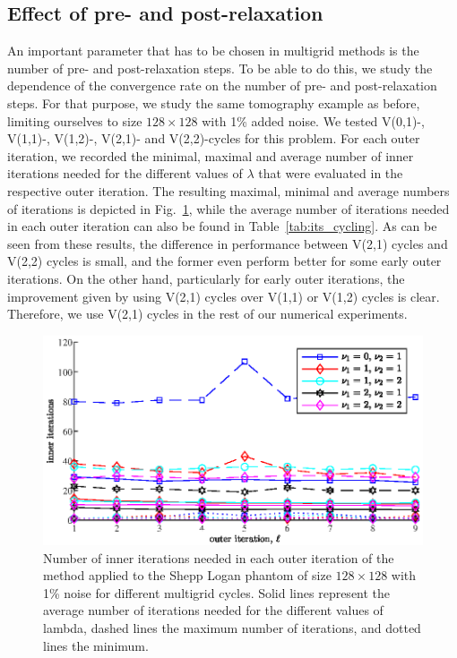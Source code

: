 \subsection{Effect of pre- and post-relaxation}
\label{ssec:relaxation_comparison}
An important parameter that has to be chosen in multigrid methods is the number of pre- and post-relaxation steps. To be able to do this, we study the dependence of the convergence rate on the number of pre- and post-relaxation steps. For that purpose, we study the same tomography example as before, limiting ourselves to size $128 \times 128$ with 1\% added noise. We tested V(0,1)-, V(1,1)-, V(1,2)-, V(2,1)- and V(2,2)-cycles for this problem. For each outer iteration, we recorded the minimal, maximal and average number of inner iterations needed for the different values of $\lambda$ that were evaluated in the respective outer iteration. The resulting maximal, minimal and average numbers of iterations is depicted in Fig.~\ref{fig:its_cycling}, while the average number of iterations needed in each outer iteration can also be found in Table~\ref{tab:its_cycling}. As can be seen from these results, the difference in performance between V(2,1) cycles and V(2,2) cycles is small, and the former even perform better for some early outer iterations.  On the other hand, particularly for early outer iterations, the improvement given by using V(2,1) cycles over V(1,1) or V(1,2) cycles is clear.   Therefore, we use V(2,1) cycles in the rest of our numerical experiments.
\begin{figure}[htbp]
\begin{center}
\includegraphics{figures/its_cycling}
\caption{Number of inner iterations needed in each outer iteration of the method applied to the Shepp Logan phantom of size $128 \times 128$ with 1\% noise for different multigrid cycles. Solid lines represent the average number of iterations needed for the different values of lambda, dashed lines the maximum number of iterations, and dotted lines the minimum.}
\label{fig:its_cycling}
\end{center}
\end{figure}
